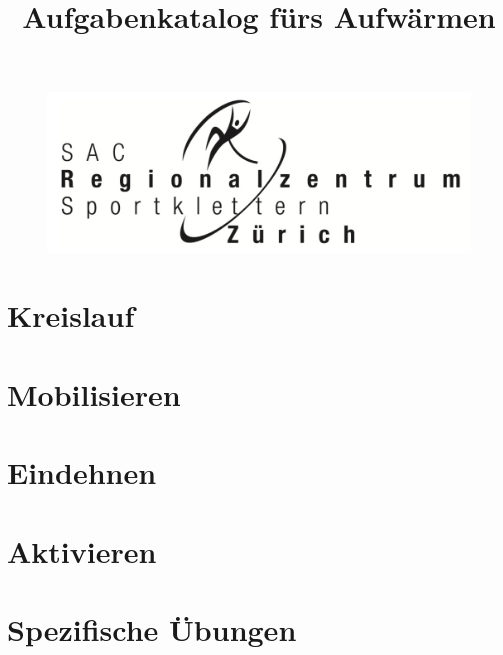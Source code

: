 \documentclass{catalogue}
\title{Aufgabenkatalog fürs Aufwärmen}
\begin{document}
    \maketitle

    \begin{figure}
        \includegraphics[width=\linewidth]{src/images/RZZ_Logo.png}
        \label{fig:RZZ_Logo}
    \end{figure}
    \newpage

    \section{Kreislauf}
        
    
    \section{Mobilisieren}
        

    \section{Eindehnen}
        
    
    \section{Aktivieren}
        

    \section{Spezifische Übungen}
        
\end{document}
